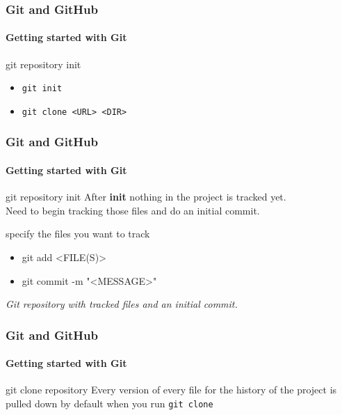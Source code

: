 \begin{frame}
    \frametitle{Git and GitHub}
    \framesubtitle{Getting started with Git}
    \addtocounter{nframe}{1}
	
	\begin{block}{git repository init}
		\begin{itemize}
			\item \texttt{git init}
			\item \texttt{git clone <URL> <DIR>}
		\end{itemize}
    \end{block}

\end{frame}


\begin{frame}
    \frametitle{Git and GitHub}
    \framesubtitle{Getting started with Git}
    \addtocounter{nframe}{1}
	
	\begin{block}{git repository init}
		After \textbf{init} nothing in the project is tracked yet.\\
		Need to begin tracking those files and do an initial commit.
	\end{block}

	\begin{block}{specify the files you want to track}
		\begin{itemize}
			\item git add <FILE(S)>
			\item git commit -m "<MESSAGE>"
		\end{itemize}
	\end{block}
	
	\textit{Git repository with tracked files and an initial commit.}
    
\end{frame}


\begin{frame}
    \frametitle{Git and GitHub}
    \framesubtitle{Getting started with Git}
    \addtocounter{nframe}{1}
	
	\begin{block}{git clone repository}
		Every version of every file for the history of the project is pulled down by default when you run \texttt{git clone}
    \end{block}

\end{frame}

